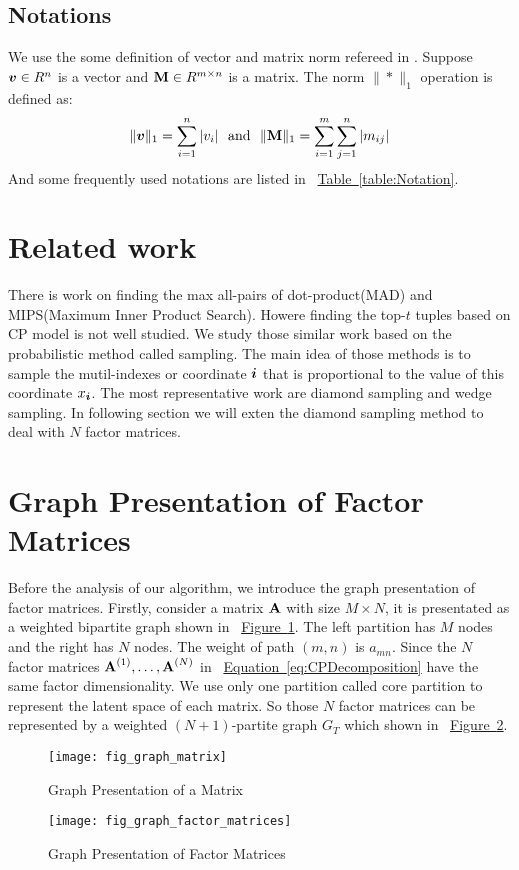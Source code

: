 \documentclass[letterpaper]{article}
\newcommand{\V}[1]{{\bm{{\MakeLowercase{#1}}}}}
\newcommand{\M}[1]{{\bm{\mathbf{\MakeUppercase{#1}}}}}
\newcommand{\Mn}[2]{\M{#1}^{(#2)}}
\newcommand{\norm}[2]{\|#1\|_{#2}}
\newcommand{\Eqn}[1] {\hyperref[eq:#1]  {Equation~\ref*{eq:#1}}}
\newcommand{\Fig}[1] {\hyperref[fig:#1] {Figure~\ref*{fig:#1}}} %
\newcommand{\Table}[1] {\hyperref[table:#1] {Table~\ref*{table:#1}}} %
\begin{document}
\subsection{Notations}

We use the some definition of vector and matrix norm refereed in \cite{BaPiKoSe15}.
Suppose $\V{v}\in R^n$ is a vector and $\M{M}\in R^{m\times n}$ is a matrix.
The norm $\norm{*}{1}$ operation is defined as:
\[
    \norm{\V{v}}{1} = \sum_{i=1}^{n}|v_i|
    \ \  {\rm and} \ \
    \norm{\M{M}}{1} = \sum_{i=1}^{m}\sum_{j=1}^{n}|m_{ij}|
\]
And some frequently used notations are listed in ~\Table{Notation}.


\section{Related work}
There is work on finding the max all-pairs of dot-product(MAD)\cite{BaPiKoSe15} and
MIPS(Maximum Inner Product Search)\cite{Cohen97,Ram12}.
Howere finding the top-$t$ tuples based on CP model is not well studied.
We study those similar work based on the probabilistic method called sampling. 
The main idea of those methods is to sample the mutil-indexes or coordinate $\V{i}$ that is proportional to the value of this coordinate $x_{\V{i}}$.
The most representative work are diamond sampling and wedge sampling. In following section we will exten the diamond sampling method to deal with $N$ factor matrices.

\section{Graph Presentation of Factor Matrices}

Before the analysis of our algorithm, we introduce the graph presentation of factor matrices.
Firstly, consider a matrix $\M{A}$ with size $M \times N$, 
it is presentated as a weighted bipartite graph shown in ~\Fig{GraphMatrix}. 
The left partition has $M$ nodes and the right has $N$ nodes. 
The weight of path $(m,n)$ is $a_{mn}$.
Since the $N$ factor matrices $\Mn{A}{1},\dots,\Mn{A}{N}$ 
in ~\Eqn{CPDecomposition} have the same factor dimensionality. 
We use only one partition called core partition to represent the latent space of each matrix.
So those $N$ factor matrices can be represented by a weighted $(N+1)$-partite graph $G_{T}$
which shown in ~\Fig{GraphMatrices}.

\begin{figure}[t]
  \centering
  \texttt{[image: fig\_graph\_matrix]}\\
  \caption{Graph Presentation of a Matrix}
  \label{fig:GraphMatrix}
\end{figure}
\begin{figure}[t]
  \centering
  \texttt{[image: fig\_graph\_factor\_matrices]}\\
  \caption{Graph Presentation of Factor Matrices}
  \label{fig:GraphMatrices}
\end{figure}
\end{document}
